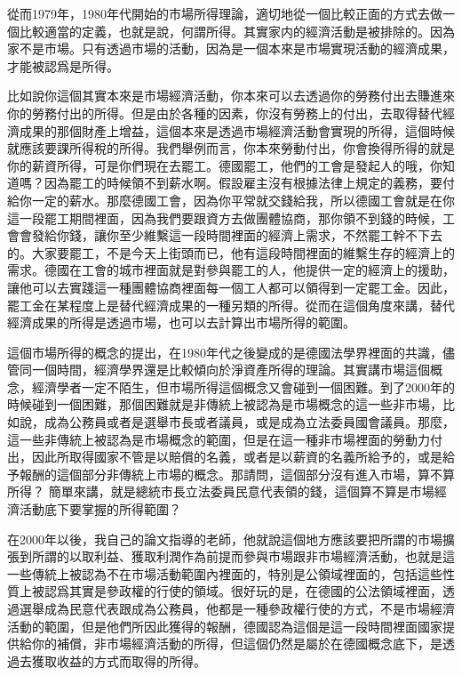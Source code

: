 \documentclass[oneside,sub3section]{ctexbook}
\begin{document}
從而1979年，1980年代開始的市場所得理論，適切地從一個比較正面的方式去做一個比較適當的定義，也就是說，何謂所得。其實家内的經濟活動是被排除的。因為家不是市場。只有透過市場的活動，因為是一個本來是市場實現活動的經濟成果，才能被認爲是所得。

比如說你這個其實本來是市場經濟活動，你本來可以去透過你的勞務付出去賺進來你的勞務付出的所得。但是由於各種的因素，你沒有勞務上的付出，去取得替代經濟成果的那個財產上增益，這個本來是透過市場經濟活動會實現的所得，這個時候就應該要課所得稅的所得。我們舉例而言，你本來勞動付出，你會換得所得的就是你的薪資所得，可是你們現在去罷工。德國罷工，他們的工會是發起人的哦，你知道嗎？因為罷工的時候領不到薪水啊。假設雇主沒有根據法律上規定的義務，要付給你一定的薪水。那麼德國工會，因為你平常就交錢給我，所以德國工會就是在你這一段罷工期間裡面，因為我們要跟資方去做團體協商，那你領不到錢的時候，工會會發給你錢，讓你至少維繫這一段時間裡面的經濟上需求，不然罷工幹不下去的。大家要罷工，不是今天上街頭而已，他有這段時間裡面的維繫生存的經濟上的需求。德國在工會的城市裡面就是對參與罷工的人，他提供一定的經濟上的援助，讓他可以去實踐這一種團體協商裡面每一個工人都可以領得到一定罷工金。因此，罷工金在某程度上是替代經濟成果的一種另類的所得。從而在這個角度來講，替代經濟成果的所得是透過市場，也可以去計算出市場所得的範圍。

這個市場所得的概念的提出，在1980年代之後變成的是德國法學界裡面的共識，儘管同一個時間，經濟學界還是比較傾向於淨資產所得的理論。其實講市場這個概念，經濟學者一定不陌生，但市場所得這個概念又會碰到一個困難。到了2000年的時候碰到一個困難，那個困難就是非傳統上被認為是市場概念的這一些非市場，比如說，成為公務員或者是選舉市長或者議員，或是成為立法委員國會議員。那麼，這一些非傳統上被認為是市場概念的範圍，但是在這一種非市場裡面的勞動力付出，因此所取得國家不管是以賠償的名義，或者是以薪資的名義所給予的，或是給予報酬的這個部分非傳統上市場的概念。那請問，這個部分沒有進入市場，算不算所得？ 簡單來講，就是總統市長立法委員民意代表領的錢，這個算不算是市場經濟活動底下要掌握的所得範圍？

在2000年以後，我自己的論文指導的老師，他就說這個地方應該要把所謂的市場擴張到所謂的以取利益、獲取利潤作為前提而參與市場跟非市場經濟活動，也就是這一些傳統上被認為不在市場活動範圍內裡面的，特別是公領域裡面的，包括這些性質上被認爲其實是參政權的行使的領域。很好玩的是，在德國的公法領域裡面，透過選舉成為民意代表跟成為公務員，他都是一種參政權行使的方式，不是市場經濟活動的範圍，但是他們所因此獲得的報酬，德國認為這個是這一段時間裡面國家提供給你的補償，非市場經濟活動的所得，但這個仍然是屬於在德國概念底下，是透過去獲取收益的方式而取得的所得。
\end{document}
